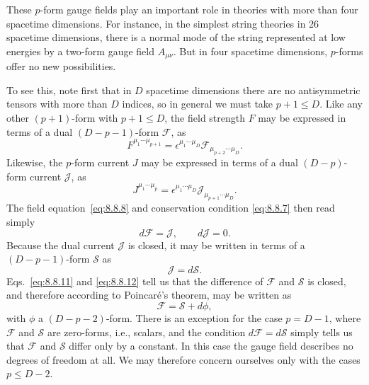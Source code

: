 These $p$-form gauge fields play an important role in theories with more than
four spacetime dimensions. For instance, in the simplest string theories in
26 spacetime dimensions, there is a normal mode of the string represented at
low energies by a two-form gauge field $A_{\mu\nu}$. But in four spacetime
dimensions, $p$-forms offer no new possibilities.

To see this, note first that in $D$ spacetime dimensions there are no
antisymmetric tensors with more than $D$ indices, so in general we must take
$p+1\leq D$. Like any other $(p+1)$-form with $p+1\leq D$, the field
strength $F$ may be expressed in terms of a dual $(D-p-1)$-form
$\mathcal F$, as
\begin{equation}
F^{\mu_1\cdots\mu_{p+1}}
=\epsilon^{\mu_1\cdots\mu_D}
\mathcal F_{\mu_{p+2}\cdots\mu_D}.
\tag{8.8.9}\label{eq:8.8.9}
\end{equation}
Likewise, the $p$-form current $J$ may be expressed in terms of a dual
$(D-p)$-form current $\mathcal J$, as
\begin{equation}
J^{\mu_1\cdots\mu_p}
=\epsilon^{\mu_1\cdots\mu_D}\mathcal J_{\mu_{p+1}\cdots\mu_D}.
\tag{8.8.10}\label{eq:8.8.10}
\end{equation}
The field equation~\eqref{eq:8.8.8} and conservation condition \eqref{eq:8.8.7} then read
simply
\begin{equation}
d\mathcal F=\mathcal J,\qquad d\mathcal J=0.
\tag{8.8.11}\label{eq:8.8.11}
\end{equation}
Because the dual current $\mathcal J$ is closed, it may be written in terms
of a $(D-p-1)$-form $\mathcal S$ as
\begin{equation}
\mathcal J=d\mathcal S.
\tag{8.8.12}\label{eq:8.8.12}
\end{equation}
Eqs.~\eqref{eq:8.8.11} and \eqref{eq:8.8.12} tell us that the difference of $\mathcal F$ and
$\mathcal S$ is closed, and therefore according to Poincaré's theorem, may be
written as
\begin{equation}
\mathcal F=\mathcal S+d\phi,
\tag{8.8.13}\label{eq:8.8.13}
\end{equation}
with $\phi$ a $(D-p-2)$-form. There is an exception for the case $p=D-1$,
where $\mathcal F$ and $\mathcal S$ are zero-forms, i.e., scalars, and the
condition $d\mathcal F=d\mathcal S$ simply tells us that $\mathcal F$ and
$\mathcal S$ differ only by a constant. In this case the gauge field describes
no degrees of freedom at all. We may therefore concern ourselves only with
the cases $p\leq D-2$.

